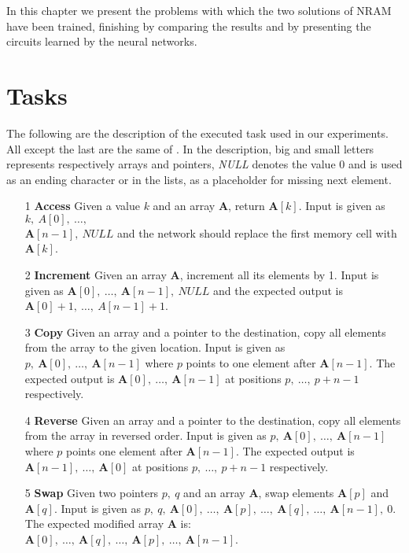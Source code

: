 \label{experiments}
In this chapter we present the problems with which the two solutions of NRAM have been trained, finishing by comparing the results and by presenting the circuits learned by the neural networks.

\section{Tasks}
The following are the description of the executed task used in our experiments. All except the last are the same of \cite{NRAM:2016}. In the description, big and small letters represents respectively arrays and pointers, \textit{NULL} denotes the value 0 and is used as an ending character or in the lists, as a placeholder for missing next element.

\begin{itemize}
	\item[1]{\textbf{Access} Given a value $k$ and an array \textbf{A}, return $\textbf{A}[k]$. Input is given as $k,\ A[0],\ \dots,\ $\\$\textbf{A}[n-1],\ \textit{NULL}$ and the network should replace the first memory cell with $\textbf{A}[k]$.}
	\item[2]{\textbf{Increment} Given an array $\textbf{A}$, increment all its elements by 1. Input is given as $\textbf{A}[0],\ \dots,\ \textbf{A}[n-1],\ \textit{NULL}$ and the expected output is $\textbf{A}[0] + 1,\ \dots,\ A[n-1] + 1$.}
	\item[3]{\textbf{Copy} Given an array and a pointer to the destination, copy all elements from the array to the given location. Input is given as $p,\ \textbf{A}[0],\ \dots,\ \textbf{A}[n-1]$ where $p$ points to one element after $\textbf{A}[n-1]$. The expected output is $\textbf{A}[0],\ \dots,\ \textbf{A}[n-1]$ at positions $p,\ \dots,\ p+n-1$ respectively.}
	\item[4]{\textbf{Reverse} Given an array and a pointer to the destination, copy all elements from the array in reversed order. Input is given as $p,\ \textbf{A}[0],\ \dots,\ \textbf{A}[n-1]$ where $p$ points one element after $\textbf{A}[n-1]$. The expected output is $\textbf{A}[n-1],\ \dots,\ \textbf{A}[0]$ at positions $p,\ \dots,\ p+n-1$ respectively.}
	\item[5]{\textbf{Swap} Given two pointers $p,\ q$ and an array \textbf{A}, swap elements $\textbf{A}[p]$ and $\textbf{A}[q]$. Input is given as $p,\ q,\ \textbf{A}[0],\ \dots,\ \textbf{A}[p],\ \dots,\ \textbf{A}[q],\ \dots,\ \textbf{A}[n-1],\ 0$. The expected modified array \textbf{A} is: $\textbf{A}[0],\ \dots,\ \textbf{A}[q],\ \dots,\ \textbf{A}[p],\ \dots,\ \textbf{A}[n-1]$.}

\end{itemize}
